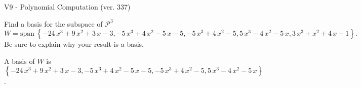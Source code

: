 \begin{exercise}
  \begin{exerciseTitle}V9 - Polynomial Computation (ver. 337)\end{exerciseTitle}
  \begin{exerciseStatement}
    Find a basis for the subspace of \(\mathcal{P}^3\) 
\[W=\mathrm{span}\ \left\{-24 \, x^{3} + 9 \, x^{2} + 3 \, x - 3 , -5 \, x^{3} + 4 \, x^{2} - 5 \, x - 5 , -5 \, x^{3} + 4 \, x^{2} - 5 , 5 \, x^{3} - 4 \, x^{2} - 5 \, x , 3 \, x^{3} + x^{2} + 4 \, x + 1\right\}.\]
 Be sure to explain why your result is a basis.


  \end{exerciseStatement}
  \begin{exerciseAnswer}
   A basis of \(W\) is  \(\left\{-24 \, x^{3} + 9 \, x^{2} + 3 \, x - 3 , -5 \, x^{3} + 4 \, x^{2} - 5 \, x - 5 , -5 \, x^{3} + 4 \, x^{2} - 5 , 5 \, x^{3} - 4 \, x^{2} - 5 \, x\right\}\).
  


  \end{exerciseAnswer}
\end{exercise}